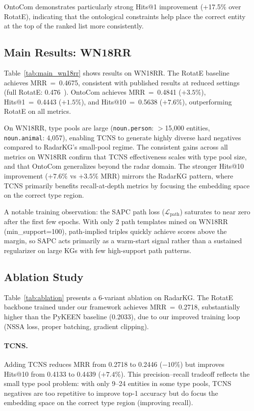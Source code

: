 \documentclass[10pt,twocolumn]{article}
\begin{document}
OntoCom demonstrates particularly strong Hits@1 improvement (+17.5\% over RotatE),
indicating that the ontological constraints help place the correct entity at the top
of the ranked list more consistently.

\subsection{Main Results: WN18RR}

Table~\ref{tab:main_wn18rr} shows results on WN18RR. The RotatE baseline
achieves MRR~=~0.4675, consistent with published results at reduced settings
(full RotatE: 0.476~\cite{sun2019rotate}).
OntoCom achieves MRR~=~0.4841 ($+3.5\%$), Hits@1~=~0.4443 ($+1.5\%$),
and Hits@10~=~0.5638 ($+7.6\%$), outperforming RotatE on all metrics.

On WN18RR, type pools are large (\texttt{noun.person}: $>$15,000 entities,
\texttt{noun.animal}: 4,057), enabling TCNS to generate highly diverse hard
negatives compared to RadarKG's small-pool regime. The consistent gains across
all metrics on WN18RR confirm that TCNS effectiveness scales with type pool size,
and that OntoCom generalizes beyond the radar domain.
The stronger Hits@10 improvement ($+7.6\%$ vs $+3.5\%$ MRR) mirrors the
RadarKG pattern, where TCNS primarily benefits recall-at-depth metrics by
focusing the embedding space on the correct type region.

A notable training observation: the SAPC path loss ($\mathcal{L}_{\text{path}}$)
saturates to near zero after the first few epochs. With only 2 path templates mined
on WN18RR (min\_support=100), path-implied triples quickly achieve scores above the
margin, so SAPC acts primarily as a warm-start signal rather than a sustained
regularizer on large KGs with few high-support path patterns.

\subsection{Ablation Study}

Table~\ref{tab:ablation} presents a 6-variant ablation on RadarKG.
The RotatE backbone trained under our framework achieves MRR~=~0.2718, substantially
higher than the PyKEEN baseline (0.2033), due to our improved training loop
(NSSA loss, proper batching, gradient clipping).

\paragraph{TCNS.}
Adding TCNS reduces MRR from 0.2718 to 0.2446 ($-10\%$) but improves Hits@10
from 0.4133 to 0.4439 ($+7.4\%$). This precision--recall tradeoff reflects
the small type pool problem: with only 9--24 entities in some type pools,
TCNS negatives are too repetitive to improve top-1 accuracy but do focus the
embedding space on the correct type region (improving recall).
\end{document}
